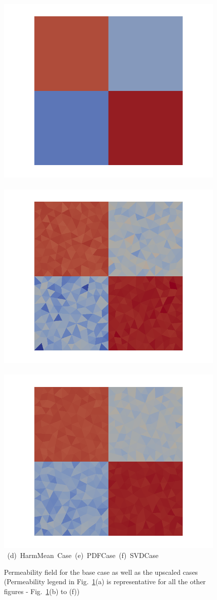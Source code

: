 \begin{landscape}
\begin{figure}[ht]
{\vspace{0.5cm}
\hbox{
      \includegraphics[width=.56\textwidth]{./Pics/HarmMeanCase/HarmMeanCase_PermField_withoutMesh2.png}
      \includegraphics[width=.56\textwidth]{./Pics/PDFCase/PDFCase_PermField_withoutMesh2.png} 
      \includegraphics[width=.56\textwidth]{./Pics/SVDCase/SVDCase_PermField_withoutMesh2.png}}
\vspace{0.cm}
\hbox{ \hspace{1.5cm} (d) HarmMean Case \hspace{4.75cm} (e) PDFCase  \hspace{5.0cm} (f) SVDCase}
\vspace{0.cm}
}   
\caption{Permeability field for the base case as well as the upscaled cases (Permeability legend in Fig.~\ref{fig:PermFields}(a) is representative for all the other figures - \ie Fig.~\ref{fig:PermFields}(b) to (f))}
\label{fig:PermFields}
\end{figure}
\end{landscape}
\clearpage



